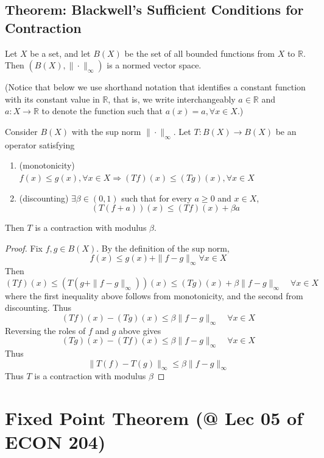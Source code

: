 \documentclass[11pt]{elegantbook}
\begin{document}
\subsection{Theorem: Blackwell's Sufficient Conditions for Contraction}
Let $X$ be a set, and let $B(X)$ be the set of all bounded functions from $X$ to $\mathbb{R}$. Then $(B(X), \|\cdot\|_\infty)$ is a normed vector space.

(Notice that below we use shorthand notation that identifies a constant function with its constant value in $\mathbb{R}$, that is, we write interchangeably $a \in \mathbb{R}$ and $a : X \rightarrow \mathbb{R}$ to denote the function such that $a(x) = a, \forall x \in X$.)

\begin{theorem}
    Consider $B(X)$ with the sup norm $\|\cdot\|_\infty$. Let $T : B(X) \rightarrow B(X)$ be an operator satisfying
    \begin{enumerate}
        \item (monotonicity) $f(x) \leq g(x), \forall x\in X \Rightarrow (T f)(x) \leq (T g)(x), \forall x \in X$
        \item (discounting) $\exists \beta \in (0, 1)$ such that for every $a \geq 0$ and $x \in X$, $$(T (f + a)) (x) \leq (T f)(x) + \beta a$$
    \end{enumerate}
    Then $T$ is a contraction with modulus $\beta$.
\end{theorem}
\begin{proof}
    Fix $f, g \in B(X)$. By the definition of the sup norm,
    $$
    f(x) \leq g(x)+\|f-g\|_{\infty} \forall x \in X
    $$
    Then
    $$
    (T f)(x) \leq\left(T\left(g+\|f-g\|_{\infty}\right)\right)(x) \leq(T g)(x)+\beta\|f-g\|_{\infty} \quad \forall x \in X
    $$
    where the first inequality above follows from monotonicity, and the second from discounting. Thus
    $$
    (T f)(x)-(T g)(x) \leq \beta\|f-g\|_{\infty} \quad \forall x \in X
    $$
    Reversing the roles of $f$ and $g$ above gives
    $$
    (T g)(x)-(T f)(x) \leq \beta\|f-g\|_{\infty} \quad \forall x \in X
    $$
    Thus
    $$
    \|T(f)-T(g)\|_{\infty} \leq \beta\|f-g\|_{\infty}
    $$
    Thus $T$ is a contraction with modulus $\beta$
\end{proof}


\section{Fixed Point Theorem \small{(@ Lec 05 of ECON 204)}}
\end{document}
